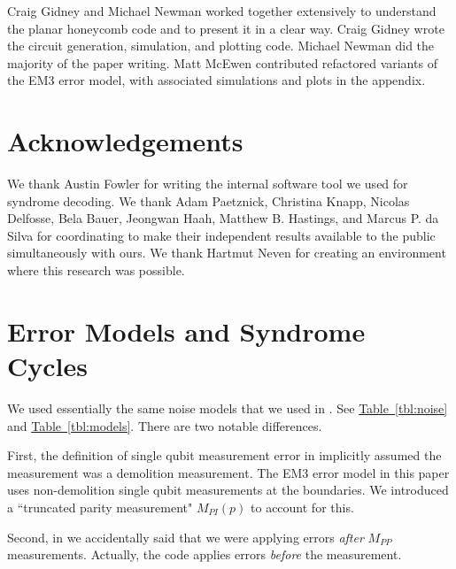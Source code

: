 \documentclass[onecolumn,unpublished,a4paper]{quantumarticle}
\theoremstyle{definition}
\theoremstyle{definition}
\theoremstyle{definition}
\newcommand{\tbl}[1]{\hyperref[tbl:#1]{Table~\ref*{tbl:#1}}}
\begin{document}
Craig Gidney and Michael Newman worked together extensively to understand the planar honeycomb code and to present it in a clear way.
Craig Gidney wrote the circuit generation, simulation, and plotting code.
Michael Newman did the majority of the paper writing.
Matt McEwen contributed refactored variants of the EM3 error model, with associated simulations and plots in the appendix.

\section{Acknowledgements}

We thank Austin Fowler for writing the internal software tool we used for syndrome decoding.
We thank Adam Paetznick, Christina Knapp, Nicolas Delfosse, Bela Bauer, Jeongwan Haah, Matthew B. Hastings, and Marcus P. da Silva for coordinating to make their independent results available to the public simultaneously with ours.
We thank Hartmut Neven for creating an environment where this research was possible.




\appendix
\section{Error Models and Syndrome Cycles}
\label{app:noise}

We used essentially the same noise models that we used in \cite{gidney2021honeycombmemory}.
See \tbl{noise} and \tbl{models}.
There are two notable differences.

First, the definition of single qubit measurement error in \cite{gidney2021honeycombmemory} implicitly assumed the measurement was a demolition measurement.
The EM3 error model in this paper uses non-demolition single qubit measurements at the boundaries.
We introduced a ``truncated parity measurement" $M_{PI}(p)$ to account for this.

Second, in \cite{gidney2021honeycombmemory} we accidentally said that we were applying errors \emph{after} $M_{PP}$ measurements.
Actually, the code applies errors \emph{before} the measurement.
\end{document}
